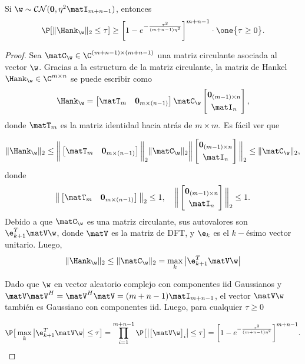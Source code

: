 	\begin{lemma}\label{Lemma:2}
		Si $\w\sim\mathcal{CN}(\mathbf{0},\eta^2\matI_{m+n-1})$, entonces 
		\begin{equation}
			\P[\|\Hank_{\w}\|_2 \leq \tau]\geq\bigg[1-e^{-\frac{\tau^2}{(m+n-1)\eta^2}}\bigg]^{m+n-1} \cdot\one\big\{\tau\geq 0\big\}.
			\label{Eq:BoundCirculantMatrix2}
		\end{equation}		 
	\end{lemma}
	\begin{proof}  Sea $\matC_{\w}\in\C^{(m+n-1)\times(m+n-1)}$ una matriz circulante asociada al vector $\w$. Gracias a la estructura de la matriz circulante, la matriz de Hankel $\Hank_{\w}\in\C^{m\times n}$ se puede escribir como
		\[\Hank_{\w} = \begin{bmatrix}\matT_m & \mathbf{0}_{m\times(n-1)}\end{bmatrix}\matC_{\w}\begin{bmatrix}\mathbf{0}_{(m-1)\times n}\\[0.3em] \matI_n
		\end{bmatrix},\]
		donde $\matT_m$ es la matriz identidad hacia atrás de $m\times m$. Es fácil ver que
		
		\[\|\Hank_{\w}\|_2\le \bigg\|\begin{bmatrix}\matT_m & \mathbf{0}_{m\times(n-1)}\end{bmatrix}\bigg\|_2\|\matC_{\w}\|_2\bigg\|\begin{bmatrix}\mathbf{0}_{(m-1)\times n}\\[0.3em] \matI_n
		\end{bmatrix}\bigg\|_2 \le \|\matC_{\w}\|_2,\]
		donde 
		\[\big\|\begin{bmatrix}\matT_m & \mathbf{0}_{m\times(n-1)}\end{bmatrix}\big\|_2\le 1,\quad \bigg\|\begin{bmatrix}\mathbf{0}_{(m-1)\times n}\\[0.3em] \matI_n
		\end{bmatrix}\bigg\|_2\le 1.\]
		Debido a que $\matC_{\w}$ es una matriz circulante, sus autovalores son $\e^T_{k+1}\matV\w$, donde $\matV$ es la matriz de DFT, y $\e_k$ es el $k-$ésimo vector unitario. Luego,
		\[\|\Hank_{\w}\|_2\le\|\matC_{\w}\|_2 = \max_k \big|\e^T_{k+1}\matV\w\big|\]
		
		Dado que $\w$ en vector aleatorio complejo con componentes iid Gaussianos y $\matV\matV^H = \matV^H\matV = (m+n-1)\matI_{m+n-1}$, el vector $\matV\w$ también es Gaussiano con componentes iid. Luego, para cualquier $\tau\ge0$
		
		\[\P\big[\max_k\big|\e_{k+1}^T\matV\w\big|\le \tau\big] = \prod_{i=1}^{m+n-1}\P\big[\big|\big[\matV\w\big]_i\big|\le \tau\big] = \bigg[1-e^{-\frac{\tau^2}{(m+n-1)\eta^2}}\bigg]^{m+n-1}.\]\end{proof}
	
